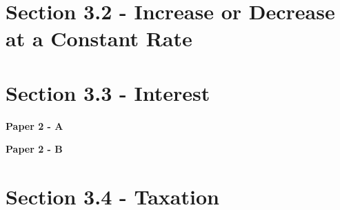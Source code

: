 \documentclass[12pt, a4paper]{article}
\begin{document}
\section*{Section 3.2 - Increase or Decrease at a Constant Rate}\label{section:3-3-2}





\section*{Section 3.3 - Interest}\label{section:3-3-3}

\textbf{Paper 2 - A}
\begin{enumx}[label=\arabic*.,start=6]
\item {}\label{DSE2013-CoreP2-Q11} 
\item {}\label{DSE2015-CoreP2-Q10} 
\item {}\label{DSE2017-CoreP2-Q10} 
\item {}\label{DSE2018-CoreP2-Q09} 
\item {}\label{DSE2019-CoreP2-Q11} 
\item {}\label{DSE2022-CoreP2-Q11} 
\end{enumx}
\textbf{Paper 2 - B}
\begin{enumx}[label=\arabic*.,start=12]
\item {}\label{DSE2012S-CoreP2-Q39} 
\end{enumx}




\section*{Section 3.4 - Taxation }\label{section:3-3-4}
\end{document}
